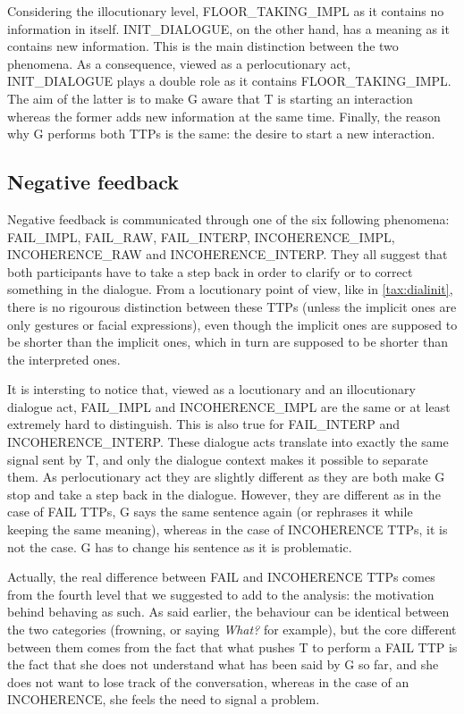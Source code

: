 	 Considering the illocutionary level, FLOOR\_TAKING\_IMPL as it contains no information in itself. INIT\_DIALOGUE, on the other hand, has a meaning as it contains new information. This is the main distinction between the two phenomena. As a consequence, viewed as a perlocutionary act, INIT\_DIALOGUE plays a double role as it contains FLOOR\_TAKING\_IMPL. The aim of the latter is to make G aware that T is starting an interaction whereas the former adds new information at the same time. Finally, the reason why G performs both TTPs is the same: the desire to start a new interaction.               

    \subsection{Negative feedback}

         Negative feedback is communicated through one of the six following phenomena: FAIL\_IMPL, FAIL\_RAW, FAIL\_INTERP, INCOHERENCE\_IMPL, INCOHERENCE\_RAW and INCOHERENCE\_INTERP. They all suggest that both participants have to take a step back in order to clarify or to correct something in the dialogue. From a locutionary point of view, like in \ref{tax:dialinit}, there is no rigourous distinction between these TTPs (unless the implicit ones are only gestures or facial expressions), even though the implicit ones are supposed to be shorter than the implicit ones, which in turn are supposed to be shorter than the interpreted ones.

         It is intersting to notice that, viewed as a locutionary and an illocutionary dialogue act, FAIL\_IMPL and INCOHERENCE\_IMPL are the same or at least extremely hard to distinguish. This is also true for FAIL\_INTERP and INCOHERENCE\_INTERP. These dialogue acts translate into exactly the same signal sent by T, and only the dialogue context makes it possible to separate them. As perlocutionary act they are slightly different as they are both make G stop and take a step back in the dialogue. However, they are different as in the case of FAIL TTPs, G says the same sentence again (or rephrases it while keeping the same meaning), whereas in the case of INCOHERENCE TTPs, it is not the case. G has to change his sentence as it is problematic.

         Actually, the real difference between FAIL and INCOHERENCE TTPs comes from the fourth level that we suggested to add to the analysis: the motivation behind behaving as such. As said earlier, the behaviour can be identical between the two categories (frowning, or saying \textit{What?} for example), but the core different between them comes from the fact that what pushes T to perform a FAIL TTP is the fact that she does not understand what has been said by G so far, and she does not want to lose track of the conversation, whereas in the case of an INCOHERENCE, she feels the need to signal a problem.

